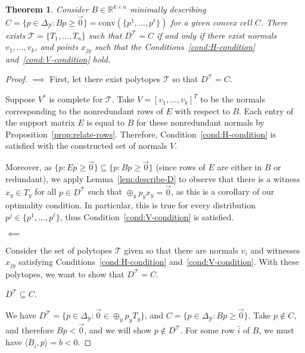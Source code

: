 \documentclass[12pt]{article}
\newcommand{\reals}{\mathbb{R}}
\newcommand{\simplex}{\Delta_\Y}
\newcommand{\T}{\mathcal{T}}
\newcommand{\Y}{\mathcal{Y}}
\newcommand{\inprod}[2]{\langle #1, #2 \rangle}%
\newcommand{\conv}{\mathrm{conv}}
\newtheorem{theorem}{Theorem}
\begin{document}
  \begin{theorem}\label{thm:nasc-optimality-conditions}
  	Consider $B \in \reals^{k \times n}$ minimally describing $C = \{p \in \simplex : Bp \geq \vec 0\} = \conv(\{p^1, \ldots, p^\ell\})$ for a given convex cell $C$.
  	There exists $\T = \{T_1, \ldots, T_n\}$ such that $D^\T = C$ if and only if there exist normals $v_1, \ldots, v_k$, and points $x_{jy}$ such that the Conditions~\ref{cond:H-condition} and~\ref{cond:V-condition} hold.
  \end{theorem}
  \begin{proof}
  	$\implies$
    First, let there exist polytopes $\T$ so that $D^\T = C$.
    
    Suppose $V^*$ is complete for $\T$.
    Take $V = [v_1, \ldots, v_k]^T$ to be the normals corresponding to the nonredundant rows of $E$ with respect to $B$.
    Each entry of the support matrix $E$ is equal to $B$ for these nonredundant normals by Proposition~\ref{prop:relate-rows}.
    Therefore, Condition~\ref{cond:H-condition} is satisfied with the constructed set of normals $V$.    
    
    Moreover, as $\{ p : Ep \geq \vec 0\} \subseteq \{p : Bp \geq \vec 0\}$ (since rows of $E$ are either in $B$ or redundant), we apply Lemma~\ref{lem:describe-D} to observe that there is a witness $x_y \in T_y$ for all $p \in D^\T$ such that $\oplus_y p_y x_y = \vec 0$, as this is a corollary of our optimality condition.
    In particular, this is true for every distribution $p^j \in \{p^1, \ldots, p^\ell\}$, thus Condition~\ref{cond:V-condition} is satisfied.
    
    \bigskip
    $\impliedby$
    
    Consider the set of polytopes $\T$ given so that there are normals $v_i$ and witnesses $x_{jy}$ satisfying Conditions~\ref{cond:H-condition} and~\ref{cond:V-condition}.
    With these polytopes, we want to show that $D^\T = C$.    

    \bigskip
    $D^\T \subseteq C$.
    \bigskip
    
    We have $D^\T = \{p \in \simplex : \vec 0 \in \oplus_y p_y T_y\}$, and $C = \{p \in \simplex : Bp \geq \vec 0\}$.
    Take $p \not \in C$, and therefore $Bp < \vec 0$, and we will show $p \not \in D^\T$.
    For some row $\bar i$ of $B$, we must have $\inprod{B_{\bar i}}{p} = b < 0$.
    

\end{proof}
\end{document}
